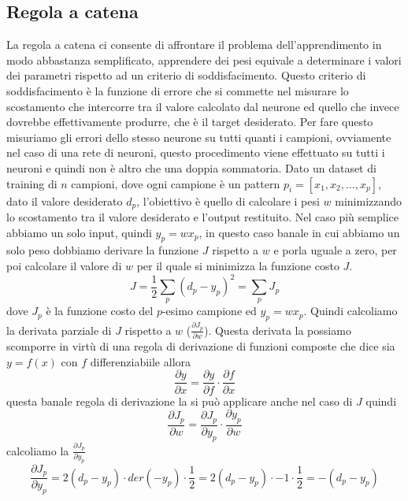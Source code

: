 \subsection{Regola a catena}
La regola a catena ci consente di affrontare il problema dell'apprendimento in modo abbastanza semplificato,  apprendere dei pesi equivale a determinare i valori dei parametri rispetto ad un criterio di soddisfacimento. Questo criterio di soddisfacimento è la funzione di errore che si commette nel misurare lo scostamento che intercorre tra il valore calcolato dal neurone ed quello che invece dovrebbe effettivamente produrre, che è il target desiderato. Per fare questo misuriamo gli errori dello stesso neurone su tutti quanti i campioni, ovviamente nel caso di una rete di neuroni, questo procedimento viene effettuato su tutti i neuroni e quindi non è altro che una doppia sommatoria.  Dato un dataset di training di $n$ campioni, dove ogni campione è un pattern $p_i = [x_1, x_2, \dots, x_p]$, dato il valore desiderato $d_p$, l'obiettivo è quello di calcolare i pesi $w$ minimizzando lo scostamento tra il valore desiderato e l'output restituito. Nel caso più semplice abbiamo un solo input, quindi  $y_p = w x_p$, in questo caso banale in cui abbiamo un solo peso dobbiamo derivare la funzione $J$ rispetto a $w$ e porla uguale a zero, per poi calcolare il valore di $w$ per il quale si minimizza la funzione costo $J$.
\begin{equation}
J = \frac{1}{2} \sum_p (d_p - y_p)^2 = \sum_p J_p
\end{equation}
dove $J_p$ è la funzione costo del $p$-esimo campione ed $y_p = w x_p$. Quindi calcoliamo la derivata parziale di $J$ rispetto a $w$ ($\frac{\partial J_p}{\partial w}$). Questa derivata la possiamo scomporre in virtù di una regola di derivazione di funzioni composte che dice sia $y=f(x)$ con $f$ differenziabiile allora
\begin{equation}
\frac{\partial y}{\partial x} = \frac{\partial y}{\partial f} \cdot \frac{\partial f}{\partial x} 
\end{equation}
questa banale regola di derivazione la si può applicare anche nel caso di $J$ quindi
\begin{equation}\label{184}
\frac{\partial J_p}{\partial w} = \frac{\partial J_p}{\partial y_p} \cdot \frac{\partial y_p}{\partial w}
\end{equation}
calcoliamo la $\frac{\partial J_p}{\partial y_p}$
\begin{equation}
\frac{\partial J_p}{\partial y_p} = 2(d_p - y_p) \cdot der(-y_p) \cdot \frac{1}{2} = 2(d_p - y_p) \cdot -1 \cdot \frac{1}{2} = -(d_p - y_p) 
\end{equation}
